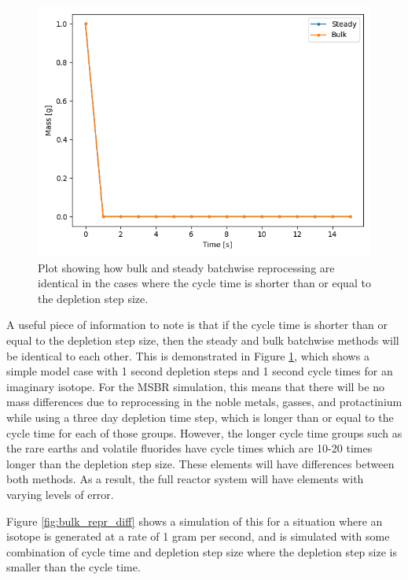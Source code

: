 
\begin{figure}[H]
  \centering
  \includegraphics[scale=0.75]{images/batch-steady-identical-compare.png}
  \caption{Plot showing how bulk and steady batchwise reprocessing are identical in the cases where the cycle time is shorter than or equal to the depletion step size.}
   \label{fig:bulk_repr_comp}
\end{figure}

A useful piece of information to note is that if the cycle time is shorter than or equal to the depletion step size, then the steady and bulk batchwise methods will be identical to each other. This is demonstrated in Figure \ref{fig:bulk_repr_comp}, which shows a simple model case with 1 second depletion steps and 1 second cycle times for an imaginary isotope. For the MSBR simulation, this means that there will be no mass differences due to reprocessing in the noble metals, gasses, and protactinium while using a three day depletion time step, which is longer than or equal to the cycle time for each of those groups. %
However, the longer cycle time groups such as the rare earths and volatile fluorides have cycle times which are 10-20 times longer than the depletion step size. These elements will have differences between both methods. As a result, the full reactor system will have elements with varying levels of error.

Figure \ref{fig:bulk_repr_diff} shows a simulation of this for a situation where an isotope is generated at a rate of 1 gram per second, and is simulated with some combination of cycle time and depletion step size where the depletion step size is smaller than the cycle time.

